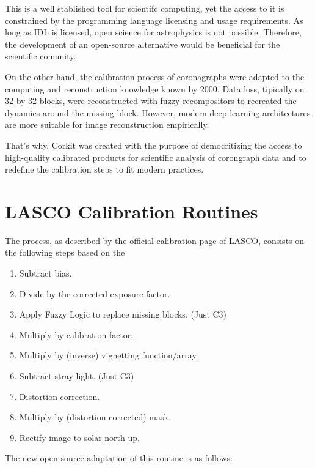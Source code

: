\documentclass[draft]{agujournal2019}
\begin{document}
This is a well stablished tool for scientifc computing, yet the access to it is constrained by the programming language licensing and usage requirements. As long as IDL is licensed, open science for astrophysics is not possible. Therefore, the development of an open-source alternative would be beneficial for the scientific comunity.

On the other hand, the calibration process of coronagraphs were adapted to the computing and reconstruction knowledge known by 2000. Data loss, tipically on 32 by 32 blocks, were reconstructed with fuzzy recompositors to recreated the dynamics around the missing block. However, modern deep learning architectures are more suitable for image reconstruction empirically.

That's why, Corkit was created with the purpose of democritizing the access to high-quality calibrated products for scientific analysis of corongraph data and to redefine the calibration steps to fit modern practices.

\section{LASCO Calibration Routines}

The process, as described by the official calibration page of LASCO, consists on the following steps based on the %

\begin{enumerate}
    \item Subtract bias.
    \item Divide by the corrected exposure factor.
    \item Apply Fuzzy Logic to replace missing blocks. (Just C3)
    \item Multiply by calibration factor.
    \item Multiply by (inverse) vignetting function/array.
    \item Subtract stray light. (Just C3)
    \item Distortion correction.
    \item Multiply by (distortion corrected) mask.
    \item Rectify image to solar north up.
\end{enumerate}

The new open-source adaptation of this routine is as follows:
\end{document}
